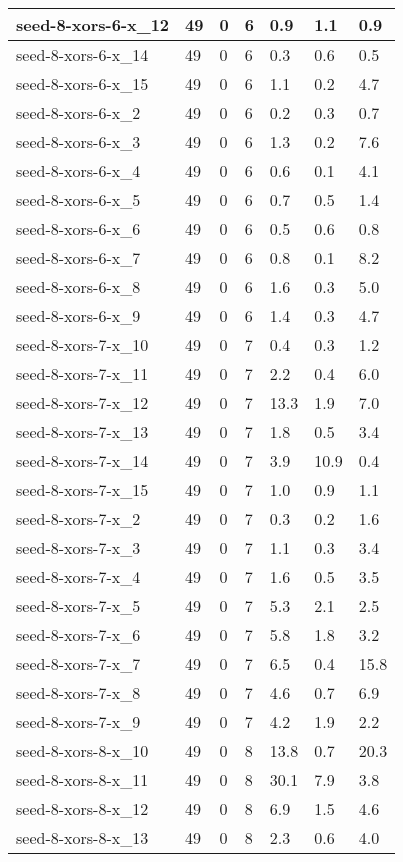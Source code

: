 \begin{scriptsize}
\begin{longtable}{|p{5cm}|l|l|l|l|l|l|}
seed-8-xors-6-x\_12&49&0&6&0.9&1.1&0.9 \\ \hline 
seed-8-xors-6-x\_14&49&0&6&0.3&0.6&0.5 \\ \hline 
seed-8-xors-6-x\_15&49&0&6&1.1&0.2&4.7 \\ \hline 
seed-8-xors-6-x\_2&49&0&6&0.2&0.3&0.7 \\ \hline 
seed-8-xors-6-x\_3&49&0&6&1.3&0.2&7.6 \\ \hline 
seed-8-xors-6-x\_4&49&0&6&0.6&0.1&4.1 \\ \hline 
seed-8-xors-6-x\_5&49&0&6&0.7&0.5&1.4 \\ \hline 
seed-8-xors-6-x\_6&49&0&6&0.5&0.6&0.8 \\ \hline 
seed-8-xors-6-x\_7&49&0&6&0.8&0.1&8.2 \\ \hline 
seed-8-xors-6-x\_8&49&0&6&1.6&0.3&5.0 \\ \hline 
seed-8-xors-6-x\_9&49&0&6&1.4&0.3&4.7 \\ \hline 
seed-8-xors-7-x\_10&49&0&7&0.4&0.3&1.2 \\ \hline 
seed-8-xors-7-x\_11&49&0&7&2.2&0.4&6.0 \\ \hline 
seed-8-xors-7-x\_12&49&0&7&13.3&1.9&7.0 \\ \hline 
seed-8-xors-7-x\_13&49&0&7&1.8&0.5&3.4 \\ \hline 
seed-8-xors-7-x\_14&49&0&7&3.9&10.9&0.4 \\ \hline 
seed-8-xors-7-x\_15&49&0&7&1.0&0.9&1.1 \\ \hline 
seed-8-xors-7-x\_2&49&0&7&0.3&0.2&1.6 \\ \hline 
seed-8-xors-7-x\_3&49&0&7&1.1&0.3&3.4 \\ \hline 
seed-8-xors-7-x\_4&49&0&7&1.6&0.5&3.5 \\ \hline 
seed-8-xors-7-x\_5&49&0&7&5.3&2.1&2.5 \\ \hline 
seed-8-xors-7-x\_6&49&0&7&5.8&1.8&3.2 \\ \hline 
seed-8-xors-7-x\_7&49&0&7&6.5&0.4&15.8 \\ \hline 
seed-8-xors-7-x\_8&49&0&7&4.6&0.7&6.9 \\ \hline 
seed-8-xors-7-x\_9&49&0&7&4.2&1.9&2.2 \\ \hline 
seed-8-xors-8-x\_10&49&0&8&13.8&0.7&20.3 \\ \hline 
seed-8-xors-8-x\_11&49&0&8&30.1&7.9&3.8 \\ \hline 
seed-8-xors-8-x\_12&49&0&8&6.9&1.5&4.6 \\ \hline 
seed-8-xors-8-x\_13&49&0&8&2.3&0.6&4.0 \\ \hline 

\end{longtable}
\end{scriptsize}
